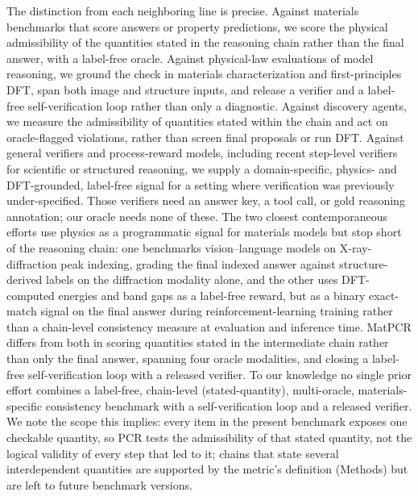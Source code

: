 \documentclass[pdflatex,sn-nature]{sn-jnl}
\newcommand{\rev}[1]{#1}
\newcommand{\rev}[1]{{\color{blue}#1}}
\begin{document}
The distinction from each neighboring line is precise. Against materials benchmarks
that score answers or property predictions,\cite{lai2025materials,llm4matbench2024,atomworld2025,matterchat2026}
we score \rev{the physical admissibility of the quantities stated in the reasoning chain} rather than the final
answer, with a label-free oracle. Against physical-law evaluations of model
reasoning,\cite{conservationbench2026,p1vl2026} we ground the check in materials
characterization and first-principles DFT, span both image and structure inputs, and
release a verifier and a label-free self-verification loop rather than only a diagnostic.
Against discovery agents,\cite{dreams2025,physrej2025} we measure \rev{the admissibility of
quantities stated within the chain} and act on oracle-flagged violations, rather than screen final proposals or
run DFT. Against general verifiers
and process-reward models,\cite{processbench2025,compassverifier2025,t1verify2025}
including recent step-level verifiers for scientific or structured reasoning,\cite{sciprm2026,vprm2026}
we supply a domain-specific, physics- and DFT-grounded, label-free signal for a setting
where verification was previously under-specified. Those verifiers need an answer key, a
tool call, or gold reasoning annotation; our oracle needs none of these. The two closest contemporaneous
efforts use physics as a programmatic signal for materials models but stop short of the
reasoning chain: one benchmarks vision--language models on X-ray-diffraction peak
indexing, grading the final indexed answer against structure-derived labels on the
diffraction modality alone,\cite{crystalxrdbench2026} and the other uses DFT-computed
energies and band gaps as a label-free reward, but as a binary exact-match signal on the
final answer during reinforcement-learning training rather than a chain-level
consistency measure at evaluation and inference time.\cite{matpref2026} MatPCR differs
from both in scoring \rev{quantities stated in the intermediate chain rather than only the final answer}, spanning four
oracle modalities, and closing a label-free self-verification loop with a released
verifier. To our knowledge no single prior effort combines a label-free,
\rev{chain-level (stated-quantity)}, multi-oracle, materials-specific consistency benchmark with a
self-verification loop and a released verifier. \rev{We note the scope this implies: every item
in the present benchmark exposes one checkable quantity, so PCR tests the admissibility of that
stated quantity, not the logical validity of every step that led to it; chains that state several
interdependent quantities are supported by the metric's definition (Methods) but are left to
future benchmark versions.}
\end{document}
